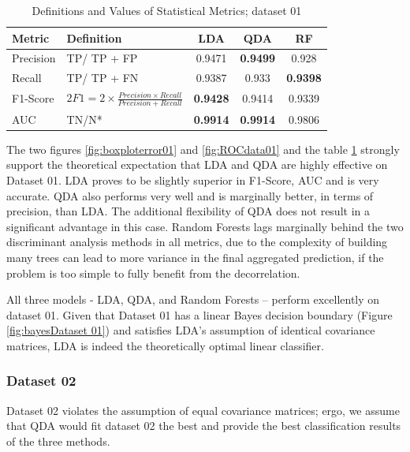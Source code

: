 \documentclass[12pt,a4paper,titlepage]{article}
\numberwithin{equation}{section}
\numberwithin{table}{section}
\numberwithin{figure}{section}
\begin{document}
        \begin{table}[h]
            \centering
            \begin{tabular}{llccc}
            \toprule
            \textbf{Metric} & \textbf{Definition} & \textbf{LDA} & \textbf{QDA} & \textbf{RF} \\
            \midrule
            Precision   & TP/ TP + FP       & 0.9471 & \textbf{0.9499} & 0.928                      \\
            Recall    & TP/ TP + FN       & 0.9387 &0.933 & \textbf{0.9398}     \\
        F1-Score  & $2F1 = 2 \times \frac{Precision\times Recall}{Precision + Recall}$      & \textbf{0.9428} & 0.9414 & 0.9339           \\
            AUC  & TN/N*      &   \textbf{0.9914} & \textbf{0.9914} & 0.9806                                                 \\
            \bottomrule
            \end{tabular}
            \caption{Definitions and Values of Statistical Metrics; dataset 01}
            \label{tab:metrics01}
        \end{table}

        \noindent The two figures \ref{fig:boxploterror01} and \ref{fig:ROCdata01} and the table \ref{tab:metrics01} strongly support the theoretical expectation that LDA and QDA are highly effective on Dataset 01. 
        LDA proves to be slightly superior in F1-Score, AUC and is very accurate. QDA also performs very well and is marginally better, in terms of precision, than LDA. The additional flexibility of QDA does not result in a significant advantage in this case. Random Forests lags marginally behind the two discriminant analysis methods in all metrics, due to the complexity of building many trees can lead to more variance in the final aggregated prediction, if the problem is too simple to fully benefit from the decorrelation.
         
        \noindent All three models - LDA, QDA, and Random Forests – perform excellently on dataset 01. Given that Dataset 01 has a linear Bayes decision boundary (Figure \ref{fig:bayesDataset 01}) and satisfies LDA's assumption of identical covariance matrices, LDA is indeed the theoretically optimal linear classifier.
        
        \subsubsection{Dataset 02}
        Dataset 02 violates the assumption of equal covariance matrices; ergo, we assume that QDA would fit dataset 02 the best and provide the best classification results of the three methods.
        
\end{document}
